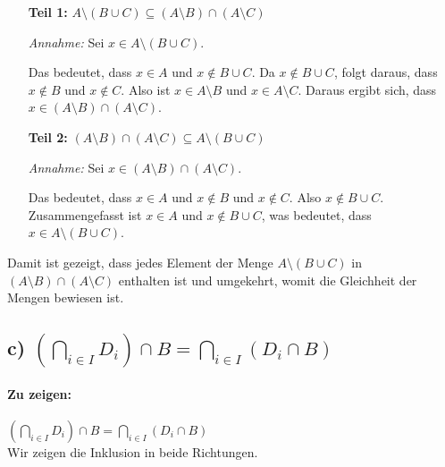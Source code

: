 \documentclass[12pt]{article}
\begin{document}
\begin{enumerate}
	\item[\textbf{Teil 1:}] \( A \setminus (B \cup C) \subseteq (A \setminus B) \cap (A \setminus C) \)

		\textit{Annahme:} Sei \(x \in A \setminus (B \cup C)\).

		Das bedeutet, dass \(x \in A\) und \(x \notin B \cup C\). Da \(x \notin B \cup C\), folgt daraus, dass \(x \notin B\) und \(x \notin C\). Also ist \(x \in A \setminus B\) und \(x \in A \setminus C\). Daraus ergibt sich, dass \(x \in (A \setminus B) \cap (A \setminus C)\).

	\item[\textbf{Teil 2:}] \((A \setminus B) \cap (A \setminus C) \subseteq A \setminus (B \cup C)\)

		\textit{Annahme:} Sei \(x \in (A \setminus B) \cap (A \setminus C)\).

		Das bedeutet, dass \(x \in A\) und \(x \notin B\) und \(x \notin C\). Also \(x \notin B \cup C\). Zusammengefasst ist \(x \in A\) und \(x \notin B \cup C\), was bedeutet, dass \(x \in A \setminus (B \cup C)\).
\end{enumerate}

Damit ist gezeigt, dass jedes Element der Menge \(A \setminus (B \cup C)\) in \((A \setminus B) \cap (A \setminus C)\) enthalten ist und umgekehrt, womit die Gleichheit der Mengen bewiesen ist.

\subsection*{c) \( \left(\bigcap_{i \in I} D_i\right) \cap B = \bigcap_{i \in I} (D_i \cap B) \)}

\paragraph{Zu zeigen:}
\( \left(\bigcap_{i \in I} D_i\right) \cap B = \bigcap_{i \in I} (D_i \cap B) \)\\Wir zeigen die Inklusion in beide Richtungen.
	
\end{document}

